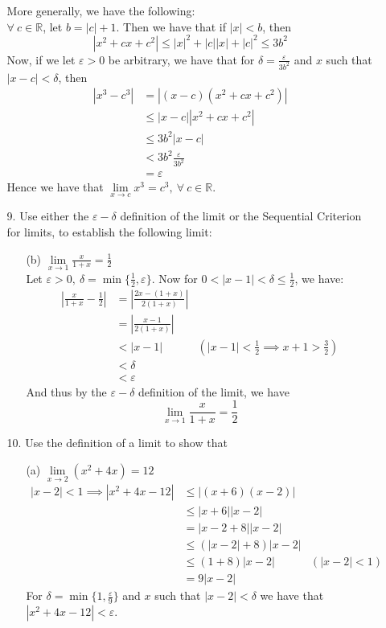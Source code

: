 \documentclass[12pt,letterpaper]{article}
\newcommand{\abs}[1]{\left\lvert #1 \right\rvert}
\newcommand{\R}{\mathbb{R}}
\theoremstyle{case}
\theoremstyle{definition}
\begin{document}
\begin{enumerate}
\begin{enumerate}
			More generally, we have the following:\\
			
			$\forall\ c \in \R$, let $b=|c|+1$. Then we have that if $|x|<b$, then
			\[|x^2+cx+c^2| \leq |x|^2 + |c||x|+|c|^2 \leq 3b^2\]
			Now, if we let $\varepsilon>0$ be arbitrary, we have that for $\delta = \frac{\varepsilon}{3b^2}$ and $x$ such that $|x-c|<\delta$, then
			\begin{align*}
				|x^3-c^3| &= |(x-c)(x^2+cx+c^2)| \\
				&\leq |x-c||x^2+cx+c^2| \\
				&\leq 3b^2|x-c| \\
				&<3b^2 \frac{\varepsilon}{3b^2} \\
				&= \varepsilon
			\end{align*}
			Hence we have that $\lim\limits_{x \to c} x^3 = c^3,\ \forall\ c \in \R$.
			
			\item[9.] Use either the $\varepsilon-\delta$ definition of the limit or the Sequential Criterion for limits, to establish the following limit:
			\begin{enumerate}
				\item[(b)] $\lim\limits_{x \to 1} \frac{x}{1+x}=\frac{1}{2}$\\
				
				Let $\varepsilon>0,\ \delta=\min \{\frac{1}{2},\varepsilon\}$. Now for $0<|x-1|<\delta\leq \frac{1}{2}$, we have:
				\begin{align*}
					\abs{\frac{x}{1+x}-\frac{1}{2}} &= \abs{\frac{2x-(1+x)}{2(1+x)}} \\
					&=\abs{\frac{x-1}{2(1+x)}} \\
					&< |x-1| &(|x-1|<\frac{1}{2} \implies x+1>\frac{3}{2}) \\
					&<\delta \\
					&<\varepsilon
				\end{align*}
				And thus by the $\varepsilon-\delta$ definition of the limit, we have
				\[\lim\limits_{x \to 1} \frac{x}{1+x}=\frac{1}{2}\]
			\end{enumerate}
		
			\item[10.] Use the definition of a limit to show that
			\begin{enumerate}
				\item[(a)] $\lim\limits_{x \to 2} (x^2+4x)=12$\\
				
				\begin{align*}
					|x-2|<1 \implies |x^2+4x-12| &\leq |(x+6)(x-2)| \\
					&\leq |x+6||x-2| \\
					&= |x-2+8||x-2| \\
					&\leq (|x-2|+8)|x-2| \\
					&\leq (1+8)|x-2| &(|x-2|<1) \\
					&=9|x-2|
				\end{align*}
				For $\delta=\min \{1,\frac{\varepsilon}{9}\}$ and $x$ such that $|x-2|<\delta$ we have that $|x^2+4x-12|<\varepsilon$.\\
				

\end{enumerate}
\end{enumerate}
\end{enumerate}
\end{document}
